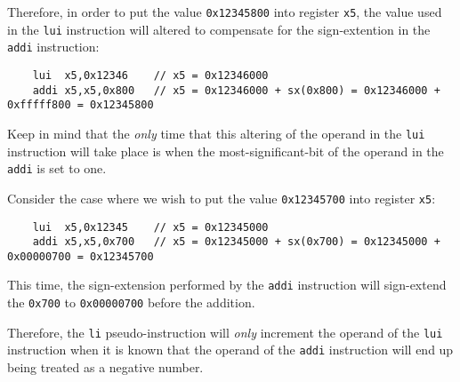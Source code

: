 Therefore, in order to put the value {\tt 0x12345800} into register {\tt x5}, the value
used in the {\tt lui} instruction will altered to compensate for the sign-extention
in the {\tt addi} instruction:

\begin{verbatim}
    lui  x5,0x12346    // x5 = 0x12346000
    addi x5,x5,0x800   // x5 = 0x12346000 + sx(0x800) = 0x12346000 + 0xfffff800 = 0x12345800
\end{verbatim}

Keep in mind that the {\em only} time that this altering of the operand in the {\tt lui}
instruction will take place is when the most-significant-bit of the operand in the
{\tt addi} is set to one.

Consider the case where we wish to put the value {\tt 0x12345700} into register {\tt x5}:

\begin{verbatim}
    lui  x5,0x12345    // x5 = 0x12345000
    addi x5,x5,0x700   // x5 = 0x12345000 + sx(0x700) = 0x12345000 + 0x00000700 = 0x12345700
\end{verbatim}

This time, the sign-extension performed by the {\tt addi} instruction will sign-extend the
{\tt 0x700} to {\tt 0x00000700} before the addition.

Therefore, the {\tt li} pseudo-instruction will {\em only} increment the operand of the
{\tt lui} instruction when it is known that the operand of the {\tt addi} instruction 
will end up being treated as a negative number.
